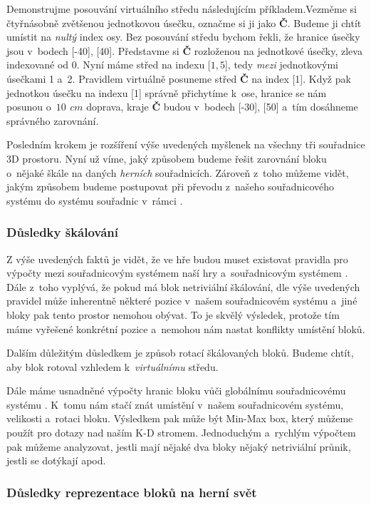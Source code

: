 Demonstrujme posouvání virtuálního středu následujícím příkladem.\linebreak Vezměme si čtyřnásobně zvětšenou jednotkovou úsečku, označme si ji jako \textbf{Č}. Budeme ji chtít umístit na \textit{nultý} index osy. Bez posouvání středu bychom řekli, že hranice úsečky jsou v~bodech [-40], [40]. Představme si \textbf{Č} rozloženou na jednotkové úsečky, zleva indexované od 0. Nyní máme střed na indexu [$1,5$], tedy \textit{mezi} jednotkovými úsečkami 1 a~2. Pravidlem  virtuálně posuneme střed \textbf{Č} na index [1]. Když pak jednotkou úsečku na indexu [1] správně přichytíme k~ose, hranice se nám posunou o~$10\,\ cm$ doprava, kraje \textbf{Č} budou v~bodech [-30], [50] a~tím dosáhneme správného zarovnání.

Posledním krokem je rozšíření výše uvedených myšlenek na všechny tři souřadnice 3D prostoru. Nyní už víme, jaký způsobem budeme řešit zarovnání bloku o~nějaké škále na daných \textit{herních} souřadnicích. Zároveň z~toho můžeme vidět, jakým způsobem budeme postupovat při převodu z~našeho souřadnicového systému do systému souřadnic v~rámci \UEu{}.
 
\subsubsection{Důsledky škálování}

Z výše uvedených faktů je vidět, že ve hře budou muset existovat pravidla pro výpočty mezi souřadnicovým systémem naší hry a~souřadnicovým systémem \UEu{}. Dále z~toho vyplývá, že pokud má blok netriviální škálování, dle výše uvedených pravidel může inherentně  některé pozice v~našem souřadnicovém systému a~jiné bloky pak tento prostor nemohou obývat. To je skvělý výsledek, protože tím máme vyřešené konkrétní pozice a~nemohou nám nastat konflikty umístění bloků.

Dalším důležitým důsledkem je způsob rotací škálovaných bloků. Budeme chtít, aby blok rotoval vzhledem k~\textit{virtuálnímu} středu. 

Dále máme usnadněné výpočty hranic bloku vůči globálnímu souřadnicovému systému \UEu{}. K~tomu nám stačí znát umístění v~našem souřadnicovém systému, velikosti a~rotaci bloku. Výsledkem pak může být Min-Max box, který můžeme použít pro dotazy nad naším K-D stromem. Jednoduchým a~rychlým výpočtem pak můžeme analyzovat, jestli mají nějaké dva bloky nějaký netriviální průnik, jestli se dotýkají apod.


\subsubsection{Důsledky reprezentace bloků na herní svět}

